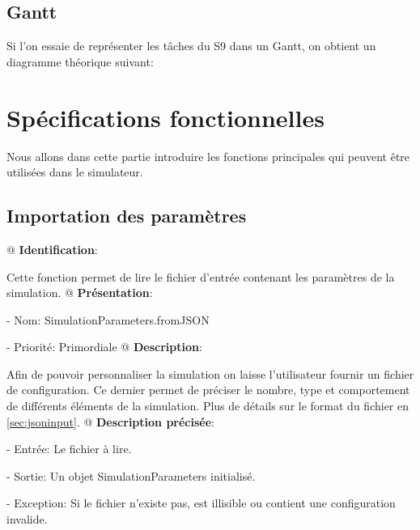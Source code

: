 \documentclass[final]{polytech/polytech}
\begin{document}
	\section{Gantt}
		Si l'on essaie de représenter les tâches du S9 dans un Gantt, on obtient un diagramme théorique suivant:

\chapter{Spécifications fonctionnelles}
	Nous allons dans cette partie introduire les fonctions principales qui peuvent être utilisées dans le simulateur.
	
	\section{Importation des paramètres}
		\begin{easylist}[enumerate]
			@ \textbf{Identification}:
			
			Cette fonction permet de lire le fichier d'entrée contenant les paramètres de la simulation.
			@ \textbf{Présentation}:
			
			- Nom: SimulationParameters.fromJSON
			
			- Priorité: Primordiale
			@ \textbf{Description}:
			
			Afin de pouvoir personnaliser la simulation on laisse l'utilisateur fournir un fichier de configuration.
			Ce dernier permet de préciser le nombre, type et comportement de différents éléments de la simulation.
			Plus de détails sur le format du fichier en \autoref{sec:jsoninput}.
			@ \textbf{Description précisée}:
			
			- Entrée: Le fichier à lire.
			
			- Sortie: Un objet SimulationParameters initialisé.
			
			- Exception: Si le fichier n'existe pas, est illisible ou contient une configuration invalide.
		\end{easylist}
		
\end{document}
